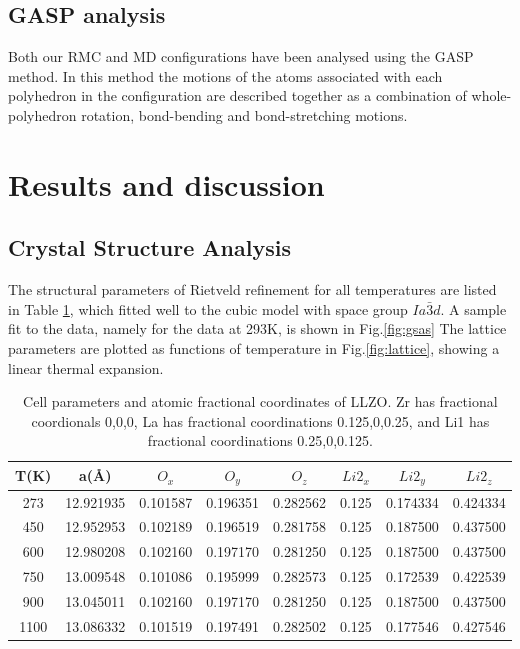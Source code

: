 \documentclass[twoside,twocolumn,9pt]{article}
\begin{document}
\subsection{GASP analysis}

Both our RMC and MD configurations have been analysed using the GASP method. In this method the motions of the atoms associated with each polyhedron in the configuration are described together as a combination of whole-polyhedron rotation, bond-bending and bond-stretching motions.


\section{Results and discussion}
\subsection{Crystal Structure Analysis}

The structural parameters of Rietveld refinement for all temperatures are listed in Table \ref{tab:cell_parameters},
which fitted well to the cubic model with space group $Ia\bar{3}d$. A sample fit to the data, namely for the data at 293K, is shown in Fig.\ref{fig:gsas}
The lattice parameters are plotted as functions of temperature in Fig.\ref{fig:lattice}, showing a linear thermal expansion.


\begin{table}[h]
\centering
\caption{Cell parameters and atomic fractional coordinates of LLZO. Zr has fractional coordionals 0,0,0, La has fractional coordinations 0.125,0,0.25, and Li1 has fractional coordinations 0.25,0,0.125. } \label{tab:cell_parameters}
\begin{tabular}{cccccccc}
\hline
\hline
T(K)  & a(\AA)   & $O_{x}$      & $O_{y}$             & $O_{z}$       & $Li2_{x}$      & $Li2_{y}$           & $Li2_{z}$      \\
\hline
273  & 12.921935 & 0.101587    & 0.196351             &0.282562       & 0.125          & 0.174334            & 0.424334       \\
450  & 12.952953 & 0.102189    & 0.196519             &0.281758       & 0.125          & 0.187500            & 0.437500       \\
600  & 12.980208 & 0.102160    & 0.197170             &0.281250       & 0.125          & 0.187500            & 0.437500       \\
750  & 13.009548 & 0.101086    & 0.195999             &0.282573       & 0.125          & 0.172539            & 0.422539       \\
900  & 13.045011 & 0.102160    & 0.197170             &0.281250       & 0.125          & 0.187500            & 0.437500       \\
1100 & 13.086332 & 0.101519    & 0.197491             &0.282502       & 0.125          & 0.177546            & 0.427546       \\
\hline
\hline
\end{tabular}
\end{table}
\end{document}
